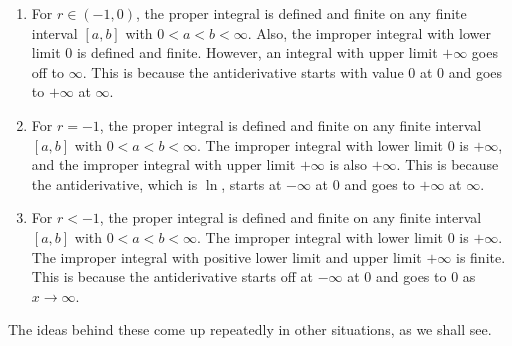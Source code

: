 \documentclass[10pt]{amsart}
\begin{document}
\begin{enumerate}
\item For $r \in (-1,0)$, the proper integral is defined and finite on
  any finite interval $[a,b]$ with $0 < a < b < \infty$. Also, the
  improper integral with lower limit $0$ is defined and
  finite. However, an integral with upper limit $+\infty$ goes off to
  $\infty$. This is because the antiderivative starts with value $0$
  at $0$ and goes to $+\infty$ at $\infty$.
\item For $r = -1$, the proper integral is defined and finite on any
  finite interval $[a,b]$ with $0 < a < b < \infty$. The improper
  integral with lower limit $0$ is $+\infty$, and the improper
  integral with upper limit $+\infty$ is also $+\infty$. This is
  because the antiderivative, which is $\ln$, starts at $-\infty$ at
  $0$ and goes to $+\infty$ at $\infty$.
\item For $r < -1$, the proper integral is defined and finite on any
  finite interval $[a,b]$ with $0 < a < b < \infty$. The improper
  integral with lower limit $0$ is $+\infty$. The improper integral
  with positive lower limit and upper limit $+\infty$ is finite. This
  is because the antiderivative starts off at $-\infty$ at $0$ and
  goes to $0$ as $x \to \infty$.
\end{enumerate}

The ideas behind these come up repeatedly in other situations, as we
shall see.
\end{document}
